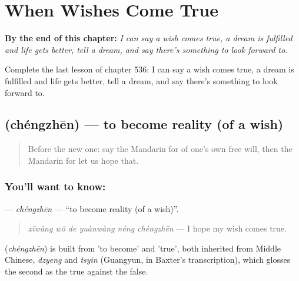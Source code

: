 
\chapter{When Wishes Come True}
\label{ch:zh-when-wishes-come-true}

\begin{chapteropening}
\textbf{By the end of this chapter:} \emph{I can say a wish comes true, a dream is fulfilled and life gets better, tell a dream, and say there's something to look forward to.}

Complete the last lesson of chapter 536: I can say a wish comes true, a dream is fulfilled and life gets better, tell a dream, and say there's something to look forward to.
\end{chapteropening}

\section[\texorpdfstring{\zh{成真} (chéngzhēn)}{成真 (chéngzhēn)}]{ (chéngzhēn) — to become reality (of a wish)}

\label{lesson:ZH-C536-chengzhen}



\begin{quote}
Before the new one: say the Mandarin for of one's own free will, then the Mandarin for let us hope that.
\end{quote}

\subsection*{You'll want to know: }
\textbf{} — \emph{chéngzhēn} — \textquotedblleft{}to become reality (of a wish)\textquotedblright{}.

\begin{quote}
\textbf{} \emph{xīwàng wǒ de yuànwàng néng chéngzhēn} — I hope my wish comes true.
\end{quote}

\begin{cousinweb}
\textbf{} (\emph{chéngzhēn}) is built from  'to become' and  'true', both inherited from Middle Chinese, \emph{dzyeng} and \emph{tsyin} (Guangyun, in Baxter's transcription), which glosses the second as the true against the false.
\end{cousinweb}

